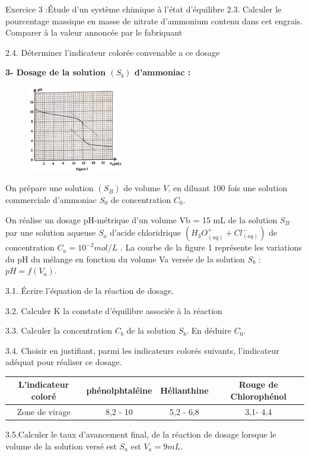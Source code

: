 \documentclass[12pt, french]{article}
\begin{document}
\begin{Box2}{Exercice 3 :Étude d’un système chimique à l’état d’équilibre }
2.3. Calculer le pourcentage massique en masse de nitrate d’ammonium contenu dans cet engrais. Comparer à la valeur annoncée par le fabriquant

2.4. Déterminer l’indicateur colorée convenable a ce dosage

\textbf{3- Dosage de la solution $(S_b)$ d’ammoniac :\dotfill}
\begin{figure}
  \begin{center}
	\includegraphics[width=0.37\textwidth]{./img/Dosage_02.png}
  \end{center}
\end{figure}
On prépare une solution $(S_B)$ de volume $V$, en diluant $100$ fois une solution commerciale d’ammoniac $S_0$ de concentration $C_0$.

On réalise un dosage pH-métrique d’un volume Vb = 15 mL de la solution $S_B$ par une solution aqueuse $S_a$ d’acide chloridrique $(H_3O^+_{(aq)} + Cl^-_{(aq)})$ de concentration $C_a = 10^{-2} mol/L$ . La courbe de la figure 1 représente
les variations du pH du mélange en fonction du volume Va versée de la
solution $S_b$ : $pH = f(V_a)$.

3.1. Écrire l’équation de la réaction de dosage.

3.2. Calculer K la constate d’équilibre associée à la réaction

3.3. Calculer la concentration $C_b$ de la solution $S_b$. En déduire $C_0$.

3.4. Choisir en justifiant, parmi les indicateurs colorés suivants, l’indicateur adéquat pour réaliser ce dosage.
\begin{center}
\begin{tabular}{ |c||c|c|c| } 
 \hline
 L'indicateur coloré & phénolphtaléine& Hélianthine &Rouge de Chlorophénol  \\\hline 
 Zone de virage		 & 8,2 - 10		   &  5,2 - 6,8 & 3,1- 4,4 \\  
 \hline
\end{tabular}
\end{center}


3.5.Calculer le taux d’avancement final, de la réaction de dosage lorsque le volume de la solution versé est  $S_a$ est $V_a = 9mL$.


\end{Box2}
\end{document}
